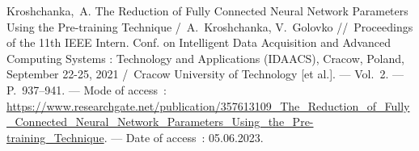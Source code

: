 Kroshchanka,~A. The Reduction of Fully Connected Neural Network Parameters Using the Pre-training Technique /~A.~Kroshchanka, V.~Golovko
\newblock //~Proceedings of the 11th IEEE Intern. Conf. on Intelligent Data Acquisition and Advanced Computing Systems : Technology and Applications (IDAACS), Cracow, Poland, September 22-25, 2021
\newblock /~Cracow University of Technology [et al.]. ---
\newblock Vol.~2. ---
\newblock P.~937--941. ---
\newblock Mode of access~: \url{https://www.researchgate.net/publication/357613109_The_Reduction_of_Fully_Connected_Neural_Network_Parameters_Using_the_Pre-training_Technique}. ---
\newblock Date of access~: 05.06.2023.





